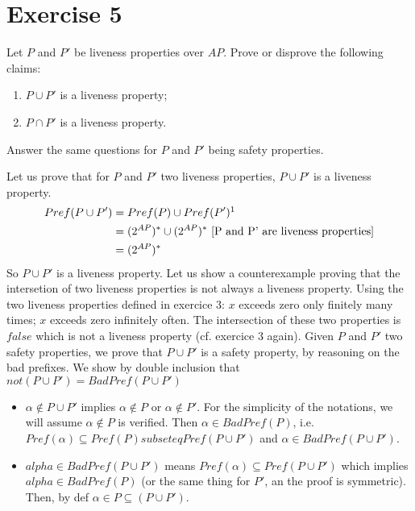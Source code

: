 \documentclass[11pt,a4paper]{article}
\begin{document}
\section*{Exercise 5}
Let $P$ and $P'$ be liveness properties over $AP$. Prove or disprove the following claims:
\begin{enumerate}
\item $P \cup P'$ is a liveness property;
\item $P \cap P'$ is a liveness property.
\end{enumerate}
Answer the same questions for $P$ and $P'$ being safety properties.

\begin{Answer}[number=5]
\Question%
Let us prove that for $P$ and $P'$ two liveness properties, $P \cup P'$ is a liveness property. 
\begin{align*}Pref(P \cup P') &= Pref(P) \cup Pref(P')\footnotemark[1]\\ 
                              &= (2^{AP})^* \cup (2^{AP})^* \text{ [P and P' are liveness properties]}\\ 
                              &= (2^{AP})^*
\end{align*}
So $P \cup P'$ is a liveness property.
\Question%
Let us show a counterexample proving that the intersetion of two liveness properties is not always a liveness property.
Using the two liveness properties defined in exercice 3: $x$ exceeds zero only finitely many times; $x$ exceeds zero infinitely often.
The intersection of these two properties is $false$ which is not a liveness property (cf. exercice 3 again).
\Question%
Given $P$ and $P'$ two safety properties, we prove that $P\cup P'$ is a safety property, by reasoning on the bad prefixes. We show by double inclusion that $ not( P\cup P') = BadPref( P\cup P')$
\begin{itemize} 
\item $\alpha \notin P\cup P'$ implies $\alpha \notin P$ or $\alpha \notin P'$. 
For the simplicity of the notations, we will assume $\alpha \notin P$ is verified. Then $\alpha \in BadPref(P)$, i.e. $Pref(\alpha) \subseteq Pref(P) subseteq Pref(P \cup P')$ and $\alpha \in BadPref(P \cup P')$.
\item $alpha \in BadPref(P\cup P')$ means $Pref(\alpha) \subseteq Pref(P \cup P')$ which implies $alpha \in BadPref(P)$ (or the same thing for $P'$, an the proof is symmetric). Then, by def $\alpha \in P \subseteq (P \cup P')$.

\end{itemize}
\end{Answer}
\end{document}
